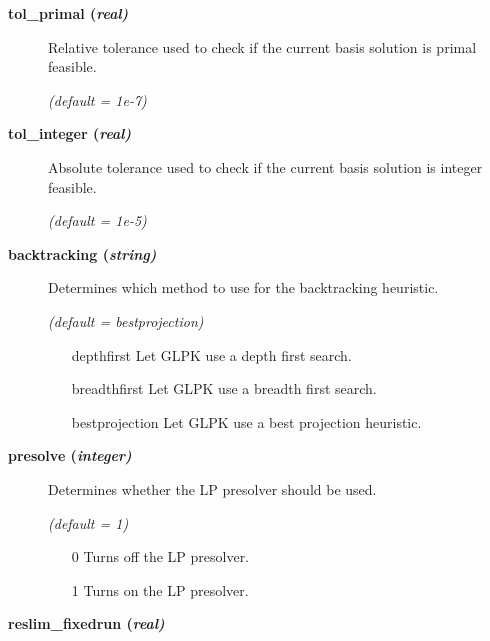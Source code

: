 \begin{description}
\item[\label{glpktol_primal}\hypertarget{glpktol_primal}
{\textbf{tol\_primal (\slshape{real})}}]\hspace{1.0in}

Relative tolerance used to check if the current basis solution is primal feasible.

\textsl{(default = 1e-7)}

\item[\label{glpktol_integer}\hypertarget{glpktol_integer}
{\textbf{tol\_integer (\slshape{real})}}]\hspace{1.0in}

Absolute tolerance used to check if the current basis solution is integer feasible.

\textsl{(default = 1e-5)}

\item[\label{backtracking}\hypertarget{backtracking}
{\textbf{backtracking (\slshape{string})}}]\hspace{1.0in}

Determines which method to use for the backtracking heuristic.

\textsl{(default = bestprojection)}
\begin{itemize}
\item[depthfirst] 
Let GLPK use a depth first search.
\item[breadthfirst] 
Let GLPK use a breadth first search.
\item[bestprojection] 
Let GLPK use a best projection heuristic.
\end{itemize}

\item[\label{glpkpresolve}\hypertarget{glpkpresolve}
{\textbf{presolve (\slshape{integer})}}]\hspace{1.0in}

Determines whether the LP presolver should be used.

\textsl{(default = 1)}
\begin{itemize}
\item[0] 
Turns off the LP presolver.
\item[1] 
Turns on the LP presolver.
\end{itemize}

\item[\label{reslim_fixedrun}\hypertarget{reslim_fixedrun}
{\textbf{reslim\_fixedrun (\slshape{real})}}]\hspace{1.0in}


\end{description}
